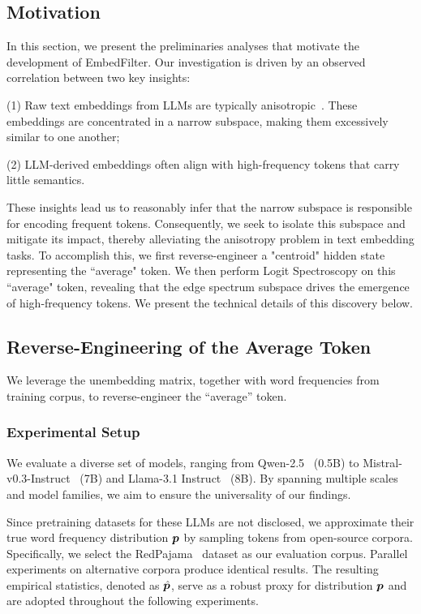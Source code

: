 \documentclass[sigconf]{acmart}
\newcommand{\name}{EmbedFilter}
\begin{document}
\subsection{Motivation}
In this section, we present the preliminaries analyses that motivate the development of \name.
Our investigation is driven by an observed correlation between two key insights:

(1) Raw text embeddings from LLMs are typically anisotropic~\cite{bertflow,whitening}. 
These embeddings are concentrated in a narrow subspace, making them excessively similar to one another; 

(2) LLM-derived embeddings often align with high-frequency tokens that carry little semantics.

These insights lead us to reasonably infer that the narrow subspace is responsible for encoding frequent tokens. 
Consequently, we seek to isolate this subspace and mitigate its impact, thereby alleviating the anisotropy problem in text embedding tasks.
To accomplish this, we first reverse-engineer a "centroid" hidden state representing the “average" token. 
We then perform Logit Spectroscopy on this “average" token, revealing that the edge spectrum subspace drives the emergence of high-frequency tokens. 
We present the technical details of this discovery below.

\subsection{Reverse-Engineering of the Average Token}
We leverage the unembedding matrix, together with word frequencies from training corpus, to reverse-engineer the “average” token.

\subsubsection{Experimental Setup}
We evaluate a diverse set of models, ranging from Qwen-2.5~\cite{qwen2.5} (0.5B) to Mistral-v0.3-Instruct~\cite{mistral7b} (7B) and Llama-3.1 Instruct~\cite{llama3} (8B). By spanning multiple scales and model families, we aim to ensure the universality of our findings.

Since pretraining datasets for these LLMs are not disclosed, we approximate their true word frequency distribution ${\bm{p}}$ by sampling tokens from open-source corpora. 
Specifically, we select the RedPajama~\cite{redpajama} dataset as our evaluation corpus.
Parallel experiments on alternative corpora produce identical results.
The resulting empirical statistics, denoted as $\hat{{\bm{p}}}$, serve as a robust proxy for distribution ${\bm{p}}$ and are adopted throughout the following experiments.
\end{document}
